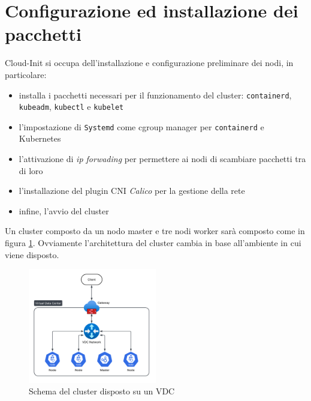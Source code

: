 \documentclass[12pt,a4paper,openright,twoside]{book}
\begin{document}
\section{Configurazione ed installazione dei pacchetti}
Cloud-Init si occupa dell'installazione e configurazione preliminare dei nodi, in particolare:
\begin{itemize}
    \item installa i pacchetti necessari per il funzionamento del cluster: \texttt{containerd}, \texttt{kubeadm}, \texttt{kubectl} e \texttt{kubelet}
    \item l'impostazione di \texttt{Systemd} come cgroup manager per \texttt{containerd} e Kubernetes
    \item l'attivazione di \textit{ip forwading} per permettere ai nodi di scambiare pacchetti tra di loro
    \item l'installazione del plugin CNI \textit{Calico} per la gestione della rete
    \item infine, l'avvio del cluster
\end{itemize}
Un cluster composto da un nodo master e tre nodi worker sarà composto come in figura \ref{fig:kube-cluster}. Ovviamente l'architettura del cluster cambia in base all'ambiente in cui viene disposto.
\begin{figure}[!hbt]
    \centering
    \includegraphics[width=0.5\textwidth]{figures/kube-vdc.png}
    \caption{Schema del cluster disposto su un VDC}
    \label{fig:kube-cluster}
\end{figure}
\end{document}
